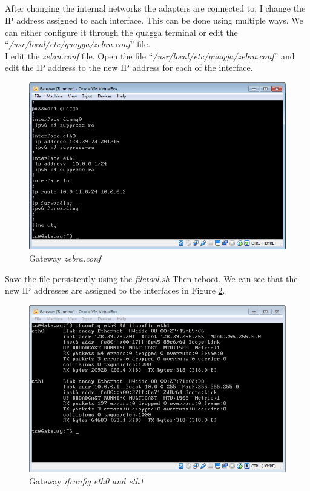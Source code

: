 \documentclass[12pt,a4paper,final]{IEEtran}
\begin{document}
\subsection{}
After changing the internal networks the adapters are connected to, I change the IP address assigned to each interface. This can be done using multiple ways. We can either configure it through the quagga terminal or edit the  ``\textit{/usr/local/etc/quagga/zebra.conf}'' file. 
\\	 
	 I edit the \textit{zebra.conf} file.
	Open the file ``\textit{/usr/local/etc/quagga/zebra.conf}'' and edit the IP address to the new IP address for each of the interface. 
	\begin{figure}[!h]	
	\includegraphics[width=1.0\textwidth]{2b_1.png}
	\caption{Gateway \textit{zebra.conf}}
	\label{tab:2b_Gateway_zebra} 
	\end{figure}

Save the file persistently using the \textit{filetool.sh} Then reboot. We can see that the new IP addresses are assigned to the interfaces in Figure \ref{tab:2b_Gateway_ifconfig}.

\begin{figure}[!h]
\includegraphics[width=1.0\textwidth]{2b_2.png}
\caption{Gateway \textit{ifconfig eth0 and eth1}}
\label{tab:2b_Gateway_ifconfig} 
\end{figure} 
\end{document}
